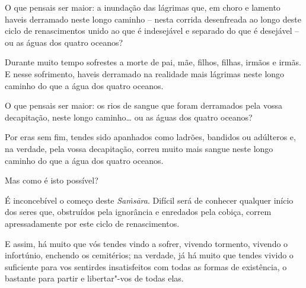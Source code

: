 O que pensais ser maior: a inundação das lágrimas que, em choro e lamento haveis
derramado neste longo caminho -- nesta corrida desenfreada ao longo deste ciclo
de renascimentos unido ao que é indesejável e separado do que é desejável -- ou
as águas dos quatro oceanos?

Durante muito tempo sofrestes a morte de pai, mãe, filhos, filhas, irmãos e
irmãs. E nesse sofrimento, haveis derramado na realidade mais lágrimas neste
longo caminho do que a água dos quatro oceanos.

O que pensais ser maior: os rios de sangue que foram derramados pela vossa
decapitação, neste longo caminho\ldots{} ou as águas dos quatro oceanos?

Por eras sem fim, tendes sido apanhados como ladrões, bandidos ou adúlteros e,
na verdade, pela vossa decapitação, correu muito mais sangue neste longo caminho
do que a água dos quatro oceanos.

Mas como é isto possível?

É inconcebível o começo deste \emph{Saṁsāra}. Difícil será de conhecer qualquer
início dos seres que, obstruídos pela ignorância e enredados pela cobiça, correm
apressadamente por este ciclo de renascimentos.


E assim, há muito que vós tendes vindo a sofrer, vivendo tormento, vivendo o
infortúnio, enchendo os cemitérios; na verdade, já há muito que tendes vivido o
suficiente para vos sentirdes insatisfeitos com todas as formas de existência, o
bastante para partir e libertar"-vos de todas elas.

